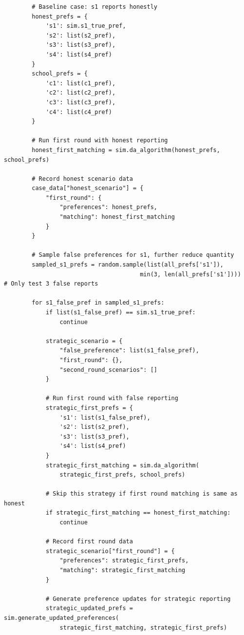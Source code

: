 \documentclass{article}
\begin{document}
\begin{verbatim}
        # Baseline case: s1 reports honestly
        honest_prefs = {
            's1': sim.s1_true_pref,
            's2': list(s2_pref),
            's3': list(s3_pref),
            's4': list(s4_pref)
        }
        school_prefs = {
            'c1': list(c1_pref),
            'c2': list(c2_pref),
            'c3': list(c3_pref),
            'c4': list(c4_pref)
        }
        
        # Run first round with honest reporting
        honest_first_matching = sim.da_algorithm(honest_prefs, school_prefs)
        
        # Record honest scenario data
        case_data["honest_scenario"] = {
            "first_round": {
                "preferences": honest_prefs,
                "matching": honest_first_matching
            }
        }
        
        # Sample false preferences for s1, further reduce quantity
        sampled_s1_prefs = random.sample(list(all_prefs['s1']), 
                                       min(3, len(all_prefs['s1'])))  # Only test 3 false reports
        
        for s1_false_pref in sampled_s1_prefs:
            if list(s1_false_pref) == sim.s1_true_pref:
                continue
                
            strategic_scenario = {
                "false_preference": list(s1_false_pref),
                "first_round": {},
                "second_round_scenarios": []
            }
            
            # Run first round with false reporting
            strategic_first_prefs = {
                's1': list(s1_false_pref),
                's2': list(s2_pref),
                's3': list(s3_pref),
                's4': list(s4_pref)
            }
            strategic_first_matching = sim.da_algorithm(
                strategic_first_prefs, school_prefs)
            
            # Skip this strategy if first round matching is same as honest
            if strategic_first_matching == honest_first_matching:
                continue
            
            # Record first round data
            strategic_scenario["first_round"] = {
                "preferences": strategic_first_prefs,
                "matching": strategic_first_matching
            }
            
            # Generate preference updates for strategic reporting
            strategic_updated_prefs = sim.generate_updated_preferences(
                strategic_first_matching, strategic_first_prefs)
            

\end{verbatim}
\end{document}
